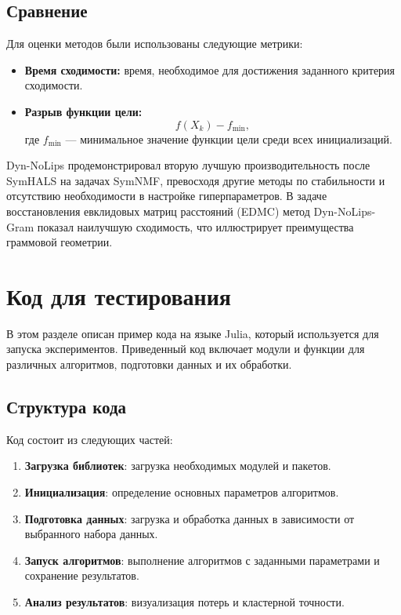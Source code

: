 \documentclass[a4paper,11pt]{article}
\begin{document}
\subsection{Сравнение}

Для оценки методов были использованы следующие метрики:
\begin{itemize}
    \item \textbf{Время сходимости:} время, необходимое для достижения заданного критерия сходимости.
    \item \textbf{Разрыв функции цели:}
    \[
    f(X_k) - f_\text{min},
    \]
    где $f_\text{min}$ — минимальное значение функции цели среди всех инициализаций.

\end{itemize}

Dyn-NoLips продемонстрировал вторую лучшую производительность после SymHALS на задачах SymNMF,
превосходя другие методы по стабильности и отсутствию необходимости в настройке гиперпараметров.
В задаче восстановления евклидовых матриц расстояний (EDMC) метод Dyn-NoLips-Gram показал
наилучшую сходимость, что иллюстрирует преимущества граммовой геометрии.

\section{Код для тестирования}
\label{sec:testing-code}
В этом разделе описан пример кода на языке Julia, который используется для запуска экспериментов. 
Приведенный код включает модули и функции для различных алгоритмов, подготовки данных и их обработки.

\subsection{Структура кода}
\label{subsec:code-structure}
Код состоит из следующих частей:
\begin{enumerate}
    \item \textbf{Загрузка библиотек}: загрузка необходимых модулей и пакетов.
    \item \textbf{Инициализация}: определение основных параметров алгоритмов.
    \item \textbf{Подготовка данных}: загрузка и обработка данных в зависимости от выбранного набора данных.
    \item \textbf{Запуск алгоритмов}: выполнение алгоритмов с заданными параметрами и сохранение результатов.
    \item \textbf{Анализ результатов}: визуализация потерь и кластерной точности.
\end{enumerate}
\end{document}
